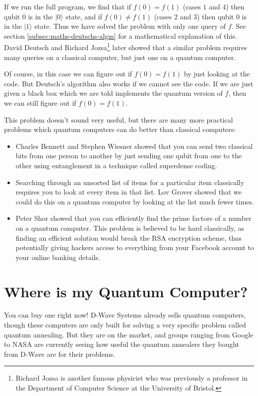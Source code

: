 \documentclass[twocolumn]{article}
\begin{document}
If we run the full program, we find that if $f(0) = f(1)$ (cases $1$ and $4$) then qubit $0$ is in the $|0\rangle$ state, and if $f(0) \neq f(1)$ (cases $2$ and $3$) then qubit $0$ is in the $|1\rangle$ state. Thus we have solved the problem with only one query of $f$. See section \ref{subsec:maths-deutschs-algm} for a mathematical explanation of this. David Deutsch and Richard Jozsa\footnote{Richard Jozsa is another famous physicist who was previously a professor in the Department of Computer Science at the University of Bristol.} later showed that a similar problem requires many queries on a classical computer, but just one on a quantum computer.

Of course, in this case we can figure out if $f(0) = f(1)$ by just looking at the code. But Deutsch's algorithm also works if we cannot see the code. If we are just given a black box which we are told implements the quantum version of $f$, then we can still figure out if $f(0) = f(1)$.

This problem doesn't sound very useful, but there are many more practical problems which quantum computers can do better than classical computers:

\begin{itemize}
\item Charles Bennett and Stephen Wiesner showed that you can send two classical bits from one person to another by just sending one qubit from one to the other using entanglement in a technique called superdense coding.
\item Searching through an unsorted list of items for a particular item classically requires you to look at every item in that list. Lov Grover showed that we could do this on a quantum computer by looking at the list much fewer times.
\item Peter Shor showed that you can efficiently find the prime factors of a number on a quantum computer. This problem is believed to be hard classically, as finding an efficient solution would break the RSA encryption scheme, thus potentially giving hackers access to everything from your Facebook account to your online banking details.
\end{itemize}

\section{Where is my Quantum Computer?}

You can buy one right now! D-Wave Systems already sells quantum computers, though these computers are only built for solving a very specific problem called quantum annealing. But they are on the market, and groups ranging from Google to NASA are currently seeing how useful the quantum annealers they bought from D-Wave are for their problems.
\end{document}
